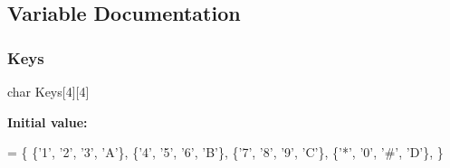 \subsection{Variable Documentation}
\mbox{\label{_kluis___v2_8ino_a25d47793dfeaea27fce0a4adfab962f7}} 
\subsubsection{\texorpdfstring{Keys}{Keys}}
{\footnotesize\ttfamily char Keys\mbox{[}4\mbox{]}\mbox{[}4\mbox{]}}

{\bfseries Initial value\+:}
\begin{DoxyCode}
= \{
  \{\textcolor{charliteral}{'1'}, \textcolor{charliteral}{'2'}, \textcolor{charliteral}{'3'}, \textcolor{charliteral}{'A'}\},
  \{\textcolor{charliteral}{'4'}, \textcolor{charliteral}{'5'}, \textcolor{charliteral}{'6'}, \textcolor{charliteral}{'B'}\},
  \{\textcolor{charliteral}{'7'}, \textcolor{charliteral}{'8'}, \textcolor{charliteral}{'9'}, \textcolor{charliteral}{'C'}\},
  \{\textcolor{charliteral}{'*'}, \textcolor{charliteral}{'0'}, \textcolor{charliteral}{'#'}, \textcolor{charliteral}{'D'}\},
\}
\end{DoxyCode}

